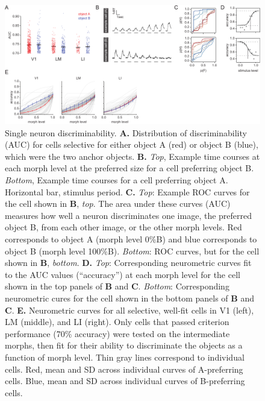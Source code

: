 \begin{figure}[t!]
    \includegraphics[width=\textwidth]{figures/chapter_4/fig_4-3_neurometric/fig_4-3_neurometric.pdf}
    \caption[Single neuron discriminability]{Single neuron discriminability. 
    \textbf{A.} Distribution of discriminability (AUC) for cells selective for either object A (red) or object B (blue), which were the two anchor objects.
    \textbf{B.} \textit{Top}, Example time courses at each morph level at the preferred size for a cell preferring object B. \textit{Bottom}, Example time courses for a cell preferring object A. Horizontal bar, stimulus period. 
    \textbf{C.} \textit{Top}: Example ROC curves for the cell shown in \textbf{B}, \textit{top}. The area under these curves (AUC) measures how well a neuron discriminates one image, the preferred object B, from each other image, or the other morph levels. Red corresponds to object A (morph level 0\%B) and blue corresponds to object B (morph level 100\%B). \textit{Bottom}: ROC curves, but for the cell shown in \textbf{B}, \textit{bottom}. 
    \textbf{D.} \textit{Top}: Corresponding neurometric curves fit to the AUC values (``accuracy'') at each morph level for the cell shown in the top panels of \textbf{B} and \textbf{C}. \textit{Bottom}: Corresponding neurometric cures for the cell shown in the bottom panels of \textbf{B} and \textbf{C}. 
    \textbf{E.} Neurometric curves for all selective, well-fit cells in V1 (left), LM (middle), and LI (right). Only cells that passed criterion performance (70\% accuracy) were tested on the intermediate morphs, then fit for their ability to discriminate the objects as a function of morph level. Thin gray lines correspond to individual cells. Red, mean and SD across individual curves of A-preferring cells. Blue, mean and SD across individual curves of B-preferring cells.
    \label{fig:neurometric}}
\end{figure}

